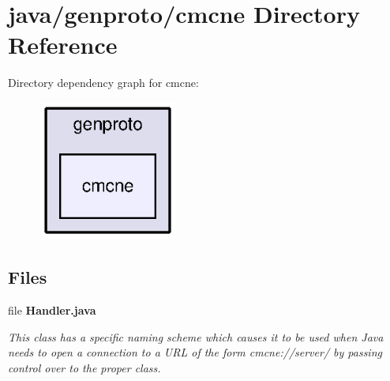 \section{java/genproto/cmcne Directory Reference}
\label{dir_1daa675e43872d4aa9c16b7c1351d540}
Directory dependency graph for cmcne\+:\nopagebreak
\begin{figure}[H]
\begin{center}
\leavevmode
\includegraphics[width=130pt]{dir_1daa675e43872d4aa9c16b7c1351d540_dep}
\end{center}
\end{figure}
\subsection*{Files}
\begin{DoxyCompactItemize}
\item 
file {\bf Handler.\+java}
\begin{DoxyCompactList}\small\item\em This class has a specific naming scheme which causes it to be used when Java needs to open a connection to a U\+R\+L of the form cmcne\+://server/ by passing control over to the proper class. \end{DoxyCompactList}\end{DoxyCompactItemize}
